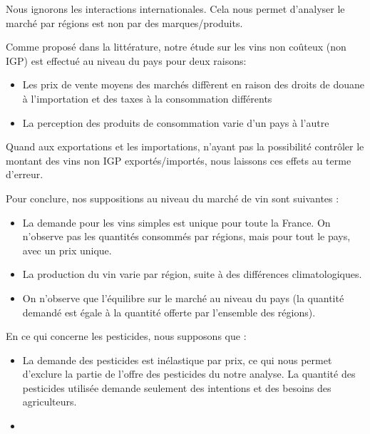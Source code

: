 \documentclass[11pt, a4paper]{article}
\begin{document}
Nous ignorons les interactions internationales. 
Cela nous permet d'analyser le marché par régions est non par des marques/produits.
\par
Comme proposé dans la littérature, notre étude sur les vins non coûteux (non IGP) est effectué au niveau du pays pour deux raisons:
\begin{itemize}
    \item Les prix de vente moyens des marchés diffèrent en raison des droits de douane à l'importation et des taxes à la consommation différents %
    \item La perception des produits de consommation varie d'un pays à l'autre %
\end{itemize}
Quand aux exportations et les importations, n'ayant pas la possibilité contrôler le montant des vins non IGP exportés/importés, nous laissons ces effets au terme d'erreur. 
\par
Pour conclure, nos suppositions au niveau du marché de vin sont suivantes :
\begin{itemize}
    \item La demande pour les vins simples est unique pour toute la France. On n'observe pas les quantités consommés par régions, mais pour tout le pays, avec un prix unique. 
    \item La production du vin varie par région, suite à des différences climatologiques.
    \item On n'observe que l'équilibre sur le marché au niveau du pays (la quantité demandé est égale à la quantité offerte par l'ensemble des régions).
\end{itemize}
En ce qui concerne les pesticides, nous supposons que :
\begin{itemize}
    \item La demande des pesticides est inélastique par prix, ce qui nous permet d'exclure la partie de l'offre des pesticides du notre analyse. La quantité des pesticides utilisée demande seulement des intentions et des besoins des agriculteurs. 
    \item 
\end{itemize}
\end{document}

